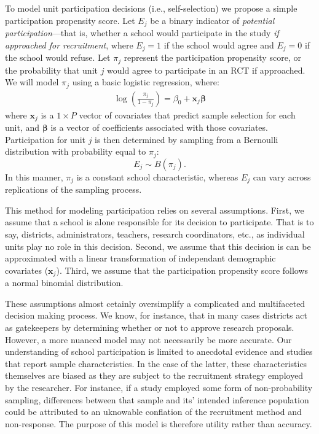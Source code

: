 \documentclass[english,man,floatsintext]{apa6}
\begin{document}
To model unit participation decisions (i.e., self-selection) we propose a simple participation propensity score. Let \(E_j\) be a binary indicator of \emph{potential participation}---that is, whether a school would participate in the study \emph{if approached for recruitment}, where \(E_j = 1\) if the school would agree and \(E_j = 0\) if the school would refuse. Let \(\pi_j\) represent the participation propensity score, or the probability that unit \(j\) would agree to participate in an RCT if approached. We will model \(\pi_j\) using a basic logistic regression, where:
\begin{align} 
\label{eq:RGM}
\log\left(\frac{\pi_j}{1 - \pi_j}\right) = \beta_0 + \mathbf{x}_j \boldsymbol\beta
\end{align}
where \(\mathbf{x}_j\) is a \(1\times P\) vector of covariates that predict sample selection for each unit, and \(\boldsymbol\beta\) is a vector of coefficients associated with those covariates. Participation for unit \(j\) is then determined by sampling from a Bernoulli distribution with probability equal to \(\pi_j\):
\begin{equation}
\label{eq:Ej}
E_j \sim B(\pi_j).
\end{equation}
In this manner, \(\pi_j\) is a constant school characteristic, whereas \(E_j\) can vary across replications of the sampling process.

This method for modeling participation relies on several assumptions. First, we assume that a school is alone responsible for its decision to participate. That is to say, districts, administrators, teachers, research coordinators, etc., as individual units play no role in this decision. Second, we assume that this decision is can be approximated with a linear transformation of independant demographic covariates (\(\mathbf{x}_j\)). Third, we assume that the participation propensity score follows a normal binomial distribution.

These assumptions almost cetainly oversimplify a complicated and multifaceted decision making process. We know, for instance, that in many cases districts act as gatekeepers by determining whether or not to approve research proposals. However, a more nuanced model may not necessarily be more accurate. Our understanding of school participation is limited to anecdotal evidence and studies that report sample characteristics.
In the case of the latter, these characteristics themselves are biased as they are subject to the recruitment strategy employed by the researcher. For instance, if a study employed some form of non-probability sampling, differences between that sample and its' intended inference population could be attributed to an uknowable conflation of the recruitment method and non-response. The purpose of this model is therefore utility rather than accuracy.
\end{document}
